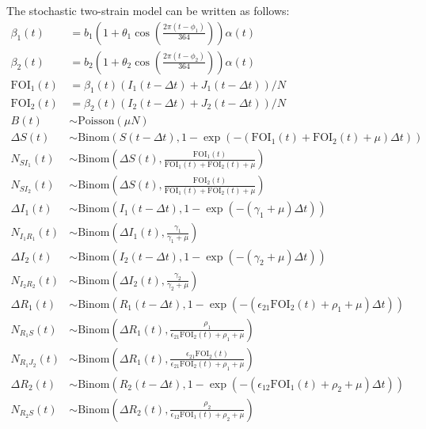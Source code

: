 \documentclass[12pt]{article}
\begin{document}
The stochastic two-strain model can be written as follows:
\begin{align}
\beta_1(t) &= b_1 \left(1 + \theta_1 \cos\left(\frac{2 \pi (t - \phi_1)}{364}\right)\right) \alpha(t)\\
\beta_2(t) &= b_2 \left(1 + \theta_2 \cos\left(\frac{2 \pi (t - \phi_2)}{364}\right)\right) \alpha(t)\\
\textrm{FOI}_1(t) &= \beta_1(t) (I_1(t- \Delta t) + J_1(t- \Delta t))/N\\
\textrm{FOI}_2(t) &= \beta_2(t) (I_2(t- \Delta t) + J_2(t- \Delta t))/N\\
B(t) &\sim \mathrm{Poisson}(\mu N)\\
\Delta S(t) &\sim \mathrm{Binom}\left(S(t-\Delta t), 1- \exp(-(\textrm{FOI}_1(t)+\textrm{FOI}_2(t) + \mu) \Delta t )\right) \\
N_{SI_1}(t) &\sim \mathrm{Binom}\left(\Delta S(t), \frac{\textrm{FOI}_1(t)}{\textrm{FOI}_1(t) + \textrm{FOI}_2(t) + \mu} \right)\\
N_{SI_2}(t) &\sim \mathrm{Binom}\left(\Delta S(t), \frac{\textrm{FOI}_2(t)}{\textrm{FOI}_1(t) + \textrm{FOI}_2(t) + \mu} \right)\\
\Delta I_1(t) &\sim \mathrm{Binom}\left(I_1(t-\Delta t), 1- \exp(-(\gamma_1 + \mu) \Delta t )\right) \\
N_{I_1R_1}(t) &\sim \mathrm{Binom}\left(\Delta I_1(t), \frac{\gamma_1}{\gamma_1 + \mu} \right)\\
\Delta I_2(t) &\sim \mathrm{Binom}\left(I_2(t-\Delta t), 1- \exp(-(\gamma_2 + \mu) \Delta t )\right) \\
N_{I_2R_2}(t) &\sim \mathrm{Binom}\left(\Delta I_2(t), \frac{\gamma_2}{\gamma_2 + \mu} \right)\\
\Delta R_1(t) &\sim \mathrm{Binom}\left(R_1(t-\Delta t), 1- \exp(-(\epsilon_{21} \textrm{FOI}_2(t) + \rho_1 + \mu) \Delta t )\right) \\
N_{R_1S}(t) &\sim \mathrm{Binom}\left(\Delta R_1(t), \frac{\rho_1}{\epsilon_{21} \textrm{FOI}_2(t) + \rho_1 + \mu} \right)\\
N_{R_1J_2}(t) &\sim \mathrm{Binom}\left(\Delta R_1(t), \frac{\epsilon_{21} \textrm{FOI}_2(t)}{\epsilon_{21} \textrm{FOI}_2(t) + \rho_1 + \mu} \right)\\
\Delta R_2(t) &\sim \mathrm{Binom}\left(R_2(t-\Delta t), 1- \exp(-(\epsilon_{12} \textrm{FOI}_1(t) + \rho_2 + \mu) \Delta t )\right) \\
N_{R_2S}(t) &\sim \mathrm{Binom}\left(\Delta R_2(t), \frac{\rho_2}{\epsilon_{12} \textrm{FOI}_1(t) + \rho_2 + \mu} \right)\\

\end{align}
\end{document}
